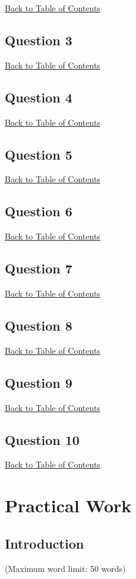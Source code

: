 \documentclass[12pt,a4paper]{article}
\begin{document}
\hyperref[contents]{\small Back to Table of Contents}
\subsection{Question 3}

\hyperref[contents]{\small Back to Table of Contents}
\subsection{Question 4}

\hyperref[contents]{\small Back to Table of Contents}
\subsection{Question 5}

\hyperref[contents]{\small Back to Table of Contents}
\subsection{Question 6}

\hyperref[contents]{\small Back to Table of Contents}
\subsection{Question 7}

\hyperref[contents]{\small Back to Table of Contents}
\subsection{Question 8}

\hyperref[contents]{\small Back to Table of Contents}
\subsection{Question 9}

\hyperref[contents]{\small Back to Table of Contents}
\subsection{Question 10}


\hyperref[contents]{\small Back to Table of Contents}
\newpage


\section{Practical Work}
\subsection{Introduction}
(Maximum word limit: 50 words)
\end{document}
